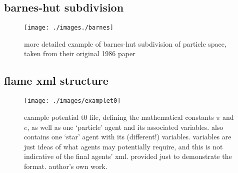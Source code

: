 \documentclass[11pt,a4paper]{article}
\begin{document}
\subsection{barnes-hut subdivision}
\label{barneshutimg}
\centering
\begin{figure}[h!]
\texttt{[image: ./images./barnes]}
\caption[barnes-hut particle-space subdivision, from their initial paper.]{more detailed example of barnes-hut subdivision of particle space, taken from their original 1986 paper \cite{barneshut}}
\end{figure}

\subsection{flame xml structure}
\label{examplet0}
\begin{figure}[h]
\texttt{[image: ./images/examplet0]}
\caption[example flame agent xml structure]{example potential t0 file, defining the mathematical constants $\pi$ and $e$, as well as one `particle' agent and its associated variables. also contains one `star' agent with its (different!) variables. variables are just ideas of what agents may potentially require, and this is not indicative of the final agents' xml. provided just to demonstrate the format. author's own work.}
\end{figure}
\end{document}
